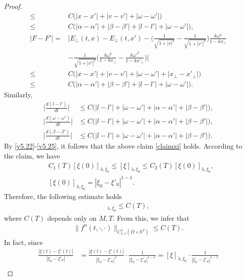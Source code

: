 \documentclass[11pt,reqno]{amsart}%
\theoremstyle{definition}
\theoremstyle{remark}
\begin{document}
\begin{proof}
\begin{align}
\leq & C\Big(|x-x'|+|v-v'|+|\omega-\omega'|\Big)\nonumber\\
\leq & C\Big(|\alpha-\alpha'|+|\beta-\beta'|+|l-l'|+|\omega-\omega'|\Big),\nonumber\\
|F-F'|=&\Big|E_{\bot}(t,x)-E_{\bot}(t,x')-\big(\frac{1}{\sqrt{1+|v|^{2}}}-\frac{1}{\sqrt{1+|v'|^{2}}}\big)\frac{k \omega^{2}}{1-k x_{\bot}}\nonumber\\
&-\frac{1}{\sqrt{1+|v'|^{2}}}\big(\frac{k \omega^{2}}{1-k x_{\bot}}-\frac{k \omega'^{2}}{1-k x'_{\bot}}\big)\Big|\nonumber\\
\leq & C\Big(|x-x'|+|v-v'|+|\omega-\omega'|+|x_{\bot}-x'_{\bot}|\Big)\nonumber\\
\leq & C\Big(|\alpha-\alpha'|+|\beta-\beta'|+|l-l'|+|\omega-\omega'|\Big).\nonumber
\end{align}
Similarly,
\begin{align}
\Big|\frac{d (l-l')}{d t}\Big|&\leq C\Big(|l-l'|+|\omega-\omega'|+|\alpha-\alpha'|+|\beta-\beta'|\Big),\label{v5.23}\\
\Big|\frac{d (\omega-\omega')}{d t}\Big|&\leq C\Big(|l-l'|+|\omega-\omega'|+|\alpha-\alpha'|+|\beta-\beta'|\Big),\label{v5.24}\\
\Big|\frac{d (\beta-\beta')}{d t}\Big|&\leq C\Big(|l-l'|+|\omega-\omega'|+|\alpha-\alpha'|+|\beta-\beta'|\Big).\label{v5.25}
\end{align}
By \eqref{v5.22}-\eqref{v5.25}, it follows that the above claim \ref{claimxi} holds. According to the claim, we have
\begin{align}
&C_{1}(T)[\xi(0)]_{\lambda,\xi_{0}}\leq [\xi]_{\lambda,\xi_{0}}\leq C_{2}(T)[\xi(0)]_{\lambda,\xi_{0}},\nonumber\\
&[\xi(0)]_{\lambda,\xi_{0}}=|\xi_{0}-\xi'_{0}|^{1-\lambda}.\nonumber
\end{align}
Therefore,  the following estimate holds
\begin{align}
[\xi]_{\lambda,\xi_{0}}\leq C(T), \label{v5.26}
\end{align}
where $C(T)$ depends only on $M,T.$ From this, we infer that
\begin{align}
\|f^{n}(t,\cdot,\cdot)\|_{C^{\lambda}_{x,v}(\bar{\Omega}\times\mathbb{R}^{2})}\leq C(T). \label{v5.27}
\end{align}
In fact, since
\begin{align}
\frac{|\xi(t)-\xi'(t)|}{|\xi_{0}-\xi'_{0}|}&=\frac{|\xi(t)-\xi'(t)|}{|\xi_{0}-\xi'_{0}|^{\lambda}}\cdot\frac{1}{|\xi_{0}-\xi'_{0}|^{1-\lambda}}
=[\xi]_{\lambda,\xi_{0}}\cdot\frac{1}{|\xi_{0}-\xi'_{0}|^{1-\lambda}}\nonumber\\

\end{align}
\end{proof}
\end{document}
